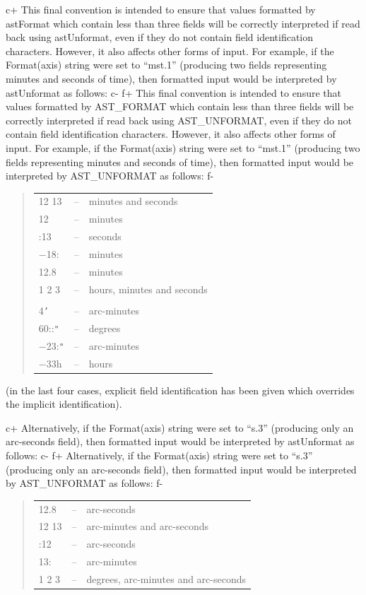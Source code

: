 \documentclass[twoside,11pt]{article}
\begin{document}
c+
This final convention is intended to ensure that values formatted by
astFormat which contain less than three fields will be correctly
interpreted if read back using astUnformat, even if they do not
contain field identification characters.  However, it also affects
other forms of input. For example, if the Format(axis) string were set
to ``mst.1'' (producing two fields representing minutes and seconds of
time), then formatted input would be interpreted by astUnformat as
follows:
c-
f+
This final convention is intended to ensure that values formatted by
AST\_FORMAT which contain less than three fields will be correctly
interpreted if read back using AST\_UNFORMAT, even if they do not
contain field identification characters.  However, it also affects
other forms of input. For example, if the Format(axis) string were set
to ``mst.1'' (producing two fields representing minutes and seconds of
time), then formatted input would be interpreted by AST\_UNFORMAT as
follows:
f-

\begin{quote}
\begin{tabular}{lll}
12 13 & -- & minutes and seconds \\
12 & -- & minutes \\
:13 & -- & seconds \\
$-$18: & -- & minutes \\
12.8 & -- & minutes \\
1 2 3 & -- & hours, minutes and seconds \\
& & \\
4{\tt{'}} & -- & arc-minutes \\
60::{\tt{"}} & -- & degrees \\
$-$23:{\tt{"}} & -- & arc-minutes \\
$-$33h & -- & hours
\end{tabular}
\end{quote}

(in the last four cases, explicit field identification has been given
which overrides the implicit identification).

c+
Alternatively, if the Format(axis) string were set to ``s.3''
(producing only an arc-seconds field), then formatted input would be
interpreted by astUnformat as follows:
c-
f+
Alternatively, if the Format(axis) string were set to ``s.3''
(producing only an arc-seconds field), then formatted input would be
interpreted by AST\_UNFORMAT as follows:
f-

\begin{quote}
\begin{tabular}{lll}
12.8 & -- & arc-seconds \\
12 13 & -- & arc-minutes and arc-seconds \\
:12 & -- & arc-seconds \\
13: & -- & arc-minutes \\
1 2 3 & -- & degrees, arc-minutes and arc-seconds
\end{tabular}
\end{quote}
\end{document}
